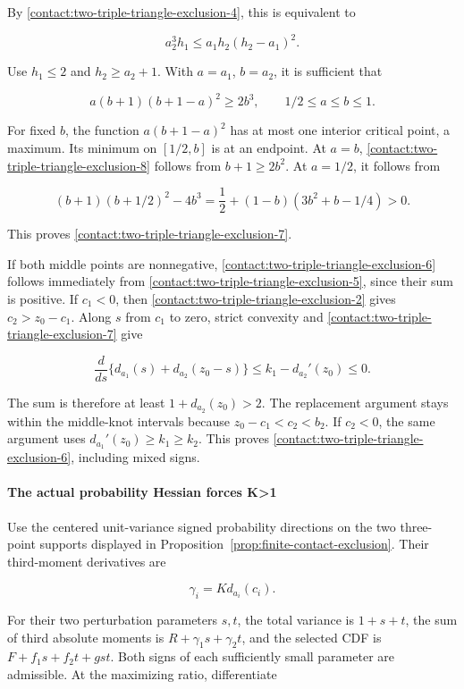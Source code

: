 By \eqref{contact:two-triple-triangle-exclusion-4}, this is equivalent to

\[
 a_2^3h_1\leq a_1h_2(h_2-a_1)^2.
\]

Use $h_1\le 2$ and $h_2\ge a_2+1$. With $a=a_1$, $b=a_2$, it is
sufficient that

\[
 a(b+1)(b+1-a)^2\geq2b^3,
 \qquad 1/2\leq a\leq b\leq1.
\tag{B.20.8}\label{contact:two-triple-triangle-exclusion-8}
\]

For fixed $b$, the function $a(b+1-a)^2$ has at most one interior
critical point, a maximum. Its minimum on $[1/2,b]$ is at an endpoint.
At $a=b$, \eqref{contact:two-triple-triangle-exclusion-8} follows from $b+1\ge 2b^2$. At $a=1/2$, it follows from

\[
 (b+1)(b+1/2)^2-4b^3
 =\frac12+(1-b)(3b^2+b-1/4)>0.
\]

This proves \eqref{contact:two-triple-triangle-exclusion-7}.

If both middle points are nonnegative, \eqref{contact:two-triple-triangle-exclusion-6} follows immediately from
\eqref{contact:two-triple-triangle-exclusion-5}, since their sum is positive. If $c_1<0$, then \eqref{contact:two-triple-triangle-exclusion-2} gives
$c_2>z_0-c_1$. Along $s$ from $c_1$ to zero, strict convexity and
\eqref{contact:two-triple-triangle-exclusion-7} give

\[
 \frac{d}{ds}\{d_{a_1}(s)+d_{a_2}(z_0-s)\}
 \leq k_1-d_{a_2}'(z_0)\leq0.
\]

The sum is therefore at least $1+d_{a_2}(z_0)>2$. The replacement
argument stays within the middle-knot intervals because
$z_0-c_1<c_2<b_2$. If $c_2<0$, the same argument uses
$d_{a_1}'(z_0)\ge k_1\ge k_2$. This proves \eqref{contact:two-triple-triangle-exclusion-6}, including mixed signs.

\paragraph{The actual probability Hessian forces K>1}

Use the centered unit-variance signed probability directions on the two
three-point supports displayed in Proposition~\ref{prop:finite-contact-exclusion}. Their third-moment
derivatives are

\[
 \gamma_i=K d_{a_i}(c_i).
\]

For their two perturbation parameters $s,t$, the total variance is
$1+s+t$, the sum of third absolute moments is $R+\gamma_1 s+\gamma_2 t$, and the selected CDF
is $F+f_1s+f_2t+g st$. Both signs of each sufficiently small parameter
are admissible. At the maximizing ratio, differentiate

